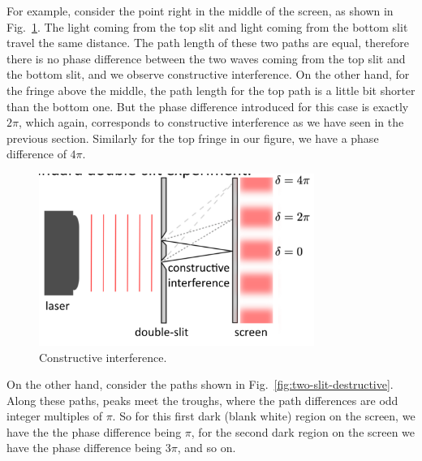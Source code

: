 
For example, consider the point right in the middle of the screen, as shown in Fig.~\ref{fig:two-slit-constructive}. The light coming from the top slit and light coming from the bottom slit travel the same distance. The path length of these two paths are equal, therefore there is no phase difference between the two waves coming from the top slit and the bottom slit, and we observe constructive interference. On the other hand, for the fringe above the middle, the path length for the top path is a little bit shorter than the bottom one. But the phase difference introduced for this case is exactly $2\pi$, which again, corresponds to constructive interference as we have seen in the previous section. Similarly for the top fringe in our figure, we have a phase difference of $4\pi$.
\begin{figure}[H]
   \centering
    \includegraphics[width=0.8\textwidth]{lesson6/double_slit_constructive.pdf}    
        \caption{Constructive interference.}
    \label{fig:two-slit-constructive}    
\end{figure}

On the other hand, consider the paths shown in Fig.~\ref{fig:two-slit-destructive}. Along these paths, peaks meet the troughs, where the path differences are odd integer multiples of $\pi$. So for this first dark (blank white) region on the screen, we have the the phase difference being $\pi$, for the second dark region on the screen we have the phase difference being $3\pi$, and so on.

